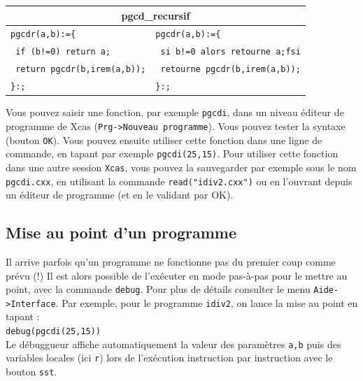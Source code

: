 \documentclass{article}
\begin{document}
\begin{giacjshere}

\begin{center}
\begin{tabular}{|l|l|}
\hline
\multicolumn{2}{|c|}{\bf pgcd\_recursif}\\
\hline\hline
\verb+pgcdr(a,b):={+ &\verb+pgcdr(a,b):={+\\
\verb+ if (b!=0) return a;+&\verb+ si b!=0 alors retourne a;fsi+\\
\verb+ return pgcdr(b,irem(a,b));+&\verb+ retourne pgcdr(b,irem(a,b));+\\
\verb+}:;+&\verb+}:;+\\
\hline
\end{tabular}
\end{center}

Vous pouvez saisir une fonction, par exemple {\tt pgcdi},
 dans un niveau \'editeur de programme de Xcas 
(\verb|Prg->Nouveau programme|). Vous pouvez tester la syntaxe
(bouton \verb|OK|). Vous pouvez ensuite utiliser cette fonction 
dans une ligne de commande, en tapant par exemple \verb|pgcdi(25,15)|.
Pour utiliser cette fonction dans une autre session {\tt Xcas}, 
vous pouvez  la sauvegarder par exemple sous le nom
\verb|pgcdi.cxx|, en utilisant la commande
\verb|read("idiv2.cxx")| ou en l'ouvrant depuis un
\'editeur de programme (et en le validant par OK).

%
\subsection{Mise au point d'un programme}
Il arrive parfois qu'un programme ne fonctionne pas du premier coup 
comme pr\'evu (!)  
Il est alors possible de l'ex\'ecuter en mode pas-\`a-pas pour le mettre 
au point, avec la 
commande \verb|debug|. Pour plus de d\'etails consulter le menu
\verb|Aide->Interface|. Par exemple, pour le programme \verb|idiv2|,
on lance la mise au point en tapant :\\
\verb|debug(pgcdi(25,15))|\\
Le d\'ebuggueur affiche automatiquement la valeur des param\`etres \verb|a,b| puis
des variables locales (ici \verb|r|) lors de l'ex\'ecution instruction par 
instruction avec le bouton \verb|sst|.
%



\end{giacjshere}
\end{document}
